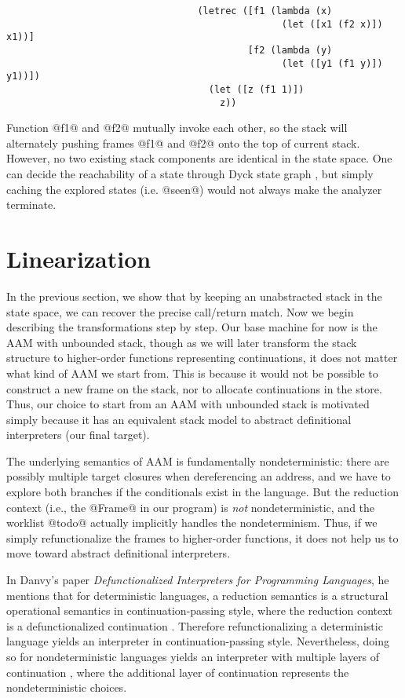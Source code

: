 \documentclass[acmsmall, review]{acmart}\settopmatter{}
\begin{document}
\begin{lstlisting}
                                  (letrec ([f1 (lambda (x)
                                                 (let ([x1 (f2 x)]) x1))]
                                           [f2 (lambda (y)
                                                 (let ([y1 (f1 y)]) y1))])
                                    (let ([z (f1 1)])
                                      z))
\end{lstlisting}

Function @f1@ and @f2@ mutually invoke each other, so the stack will alternately pushing
frames @f1@ and @f2@ onto the top of current stack. However, no two existing stack
components are identical in the state space. One can decide the reachability of a state
through Dyck state graph \cite{earl2010pushdown, earl2012introspective}, but simply
caching the explored states (i.e. @seen@) would not always make the analyzer terminate.


\section{Linearization} \label{linear}

In the previous section, we show that by keeping an unabstracted stack in the state
space, we can recover the precise call/return match. Now we begin describing the
transformations step by step. Our base machine for now is the AAM with unbounded
stack, though as we will later transform the stack structure to higher-order functions
representing continuations, it does not matter what kind of AAM we start from.
This is because it would not be possible to construct a new frame on the stack, nor
to allocate continuations in the store.
Thus, our choice to start from an AAM with unbounded stack is motivated simply because
it has an equivalent stack model to abstract definitional interpreters (our final target).

The underlying semantics of AAM is fundamentally nondeterministic: there are possibly
multiple target closures when dereferencing an address, and we have to explore both branches
if the conditionals exist in the language. But the reduction context (i.e., the @Frame@ in
our program) is \emph{not} nondeterministic, and the worklist @todo@ actually implicitly
handles the nondeterminism. Thus, if we simply refunctionalize the frames to higher-order
functions, it does not help us to move toward abstract definitional interpreters.

In Danvy's paper \textit{Defunctionalized Interpreters for Programming Languages},
he mentions that for deterministic languages, a reduction semantics is a structural
operational semantics in continuation-passing style, where the reduction context is
a defunctionalized continuation \cite{Danvy:2008:DIP:1411204.1411206}. Therefore
refunctionalizing a deterministic language yields an interpreter in continuation-passing
style. Nevertheless, doing so for nondeterministic languages yields an interpreter
with multiple layers of continuation \cite{Danvy:2006:RW:2171265.2171268, DANVY2009534},
where the additional layer of continuation represents the nondeterministic choices.
\end{document}

